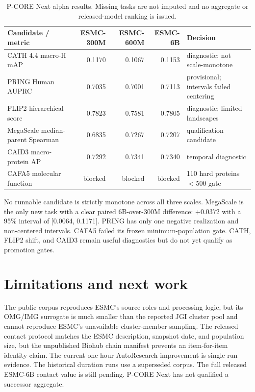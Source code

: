 \documentclass{article}
\begin{document}
\begin{table}[H]
  \centering
  \scriptsize
  \setlength{\tabcolsep}{3pt}
  \begin{tabularx}{\textwidth}{@{}YrrrY@{}}
    \toprule
    Candidate / metric & ESMC-300M & ESMC-600M & ESMC-6B & Decision \\
    \midrule
    CATH 4.4 macro-H mAP & 0.1170 & 0.1067 & 0.1153 & diagnostic; not scale-monotone \\
    PRING Human AUPRC & 0.7035 & 0.7001 & 0.7113 & provisional; intervals failed centering \\
    FLIP2 hierarchical score & 0.7823 & 0.7581 & 0.7805 & diagnostic; limited landscapes \\
    MegaScale median-parent Spearman & 0.6835 & 0.7267 & 0.7207 & qualification candidate \\
    CAID3 macro-protein AP & 0.7292 & 0.7341 & 0.7340 & temporal diagnostic \\
    CAFA5 molecular function & blocked & blocked & blocked & 110 hard proteins $<500$ gate \\
    \bottomrule
  \end{tabularx}
  \caption{P-CORE Next alpha results. Missing tasks are not imputed and no
  aggregate or released-model ranking is issued.}
  \label{tab:pcore-next}
\end{table}

No runnable candidate is strictly monotone across all three scales. MegaScale
is the only new task with a clear paired 6B-over-300M difference:
$+0.0372$ with a 95\% interval of [0.0064, 0.1171]. PRING has only one
negative realization and non-centered intervals. CAFA5 failed its frozen
minimum-population gate. CATH, FLIP2 shift, and CAID3 remain useful
diagnostics but do not yet qualify as promotion gates.

\section{Limitations and next work}

The public corpus reproduces ESMC's source roles and processing logic, but its
OMG/IMG surrogate is much smaller than the reported JGI cluster pool and
cannot reproduce ESMC's unavailable cluster-member sampling. The released
contact protocol matches the ESMC description, snapshot date, and population
size, but the unpublished Biohub chain manifest prevents an item-for-item
identity claim. The current one-hour AutoResearch improvement is single-run
evidence. The historical duration runs use a superseded corpus. The full
released ESMC-6B contact value is still pending. P-CORE Next has not qualified
a successor aggregate.
\end{document}
